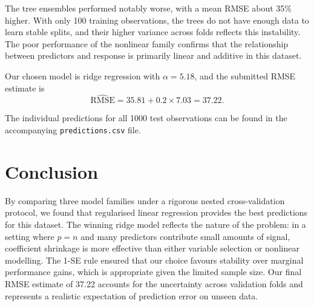 \documentclass{article}
\begin{document}
The tree ensembles performed notably worse, with a mean RMSE about 35\% higher. With only 100 training observations, the trees do not have enough data to learn stable splits, and their higher variance across folds reflects this instability. The poor performance of the nonlinear family confirms that the relationship between predictors and response is primarily linear and additive in this dataset.

Our chosen model is ridge regression with $\alpha = 5.18$, and the submitted RMSE estimate is
\[
  \widehat{\text{RMSE}} = 35.81 + 0.2 \times 7.03 = 37.22.
\]

The individual predictions for all 1000 test observations can be found in the accompanying \texttt{predictions.csv} file.

\section*{Conclusion}

By comparing three model families under a rigorous nested cross-validation protocol, we found that regularised linear regression provides the best predictions for this dataset. The winning ridge model reflects the nature of the problem: in a setting where $p = n$ and many predictors contribute small amounts of signal, coefficient shrinkage is more effective than either variable selection or nonlinear modelling. The 1-SE rule ensured that our choice favours stability over marginal performance gains, which is appropriate given the limited sample size. Our final RMSE estimate of 37.22 accounts for the uncertainty across validation folds and represents a realistic expectation of prediction error on unseen data.
\end{document}
